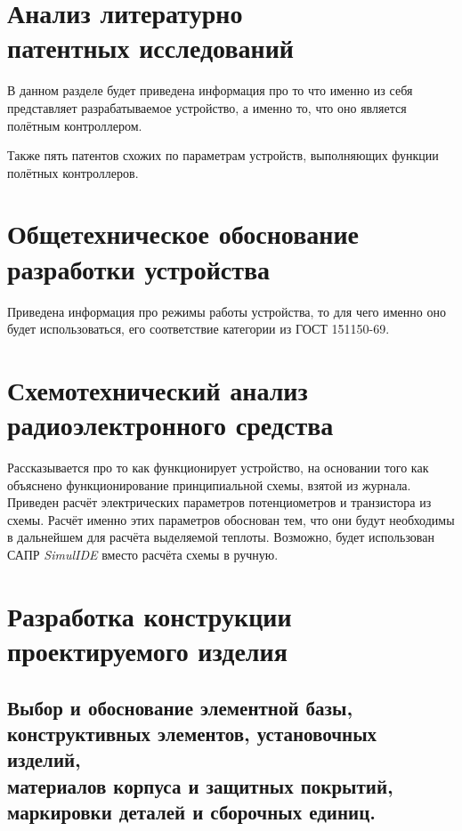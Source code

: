 \documentclass[a4paper]{bsuir-std}
\begin{document}


\section{Анализ литературно \\
  патентных исследований}

В данном разделе будет приведена информация про то что именно из
себя представляет разрабатываемое устройство, а именно то,
что оно является полётным контроллером.

Также пять патентов схожих по параметрам
устройств, выполняющих функции полётных контроллеров.

\section{Общетехническое обоснование \\
  разработки устройства}

Приведена информация про режимы работы устройства, то для чего именно
оно будет использоваться, его соответствие категории из ГОСТ 151150-69.


\section{Схемотехнический анализ \\
  радиоэлектронного средства}

Рассказывается про то как функционирует устройство, на основании того
как объяснено функционирование принципиальной схемы, взятой из
журнала. Приведен расчёт электрических параметров потенциометров и
транзистора из схемы. Расчёт именно этих параметров обоснован тем, что
они будут необходимы в дальнейшем для расчёта выделяемой теплоты.
Возможно, будет использован САПР \textit{SimulIDE} вместо расчёта
схемы в ручную.


\section{Разработка конструкции \\
  проектируемого изделия} %

\subsection{Выбор и обоснование элементной базы,\\
  конструктивных элементов, установочных изделий, \\
  материалов корпуса и защитных покрытий,\\
  маркировки деталей и сборочных единиц. }
\end{document}
